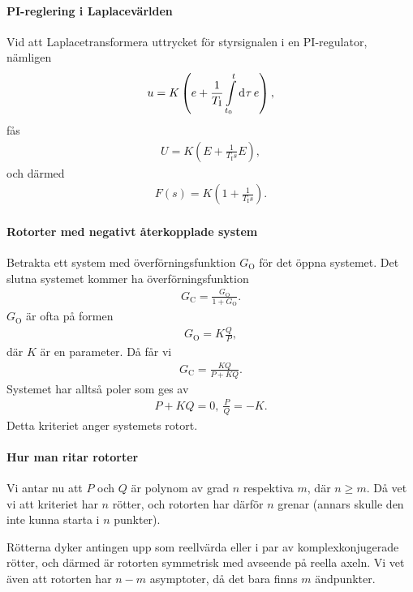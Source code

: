 \paragraph{PI-reglering i Laplacevärlden}
Vid att Laplacetransformera uttrycket för styrsignalen i en PI-regulator, nämligen
\begin{align*}
	u = K\left(e + \frac{1}{T_{\text{I}}}\int\limits_{t_{0}}^{t}\dd[]{\tau}e\right),
\end{align*}
fås
\begin{align*}
	U = K\left(E + \frac{1}{T_{\text{I}}s}E\right),
\end{align*}
och därmed
\begin{align*}
	F(s) = K\left(1 + \frac{1}{T_{\text{I}}s}\right).
\end{align*}

\paragraph{Rotorter med negativt återkopplade system}
Betrakta ett system med överförningsfunktion $G_{\text{O}}$ för det öppna systemet. Det slutna systemet kommer ha överförningsfunktion
\begin{align*}
	G_{\text{C}} = \frac{G_{\text{O}}}{1 + G_{\text{O}}}.
\end{align*}
$G_{\text{O}}$ är ofta på formen
\begin{align*}
	G_{\text{O}} = K\frac{Q}{P},
\end{align*}
där $K$ är en parameter. Då får vi
\begin{align*}
	G_{\text{C}} = \frac{KQ}{P + KQ}.
\end{align*}
Systemet har alltså poler som ges av
\begin{align*}
	P + KQ = 0,\ \frac{P}{Q} = -K.
\end{align*}
Detta kriteriet anger systemets rotort.

\paragraph{Hur man ritar rotorter}
Vi antar nu att $P$ och $Q$ är polynom av grad $n$ respektiva $m$, där $n \geq m$. Då vet vi att kriteriet har $n$ rötter, och rotorten har därför $n$ grenar (annars skulle den inte kunna starta i $n$ punkter).

Rötterna dyker antingen upp som reellvärda eller i par av komplexkonjugerade rötter, och därmed är rotorten symmetrisk med avseende på reella axeln. Vi vet även att rotorten har $n - m$ asymptoter, då det bara finns $m$ ändpunkter.

